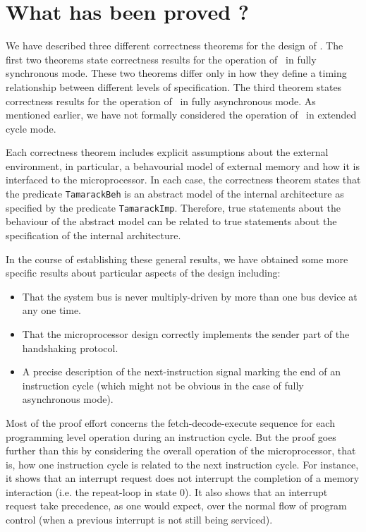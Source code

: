 \section{What has been proved ?}

We have described three different correctness theorems for the
design of \Tamarack.  The first two theorems state correctness
results for the operation of \Tamarack\ in fully synchronous mode.
These two theorems differ only in how they define a timing relationship
between different levels of specification.
The third theorem states correctness results for the operation of
\Tamarack\ in fully asynchronous mode.
As mentioned earlier, we have not formally considered the operation of
\Tamarack\ in extended cycle mode.

Each correctness theorem includes explicit assumptions about
the external environment, in particular,
a behavourial model of external memory and how it is interfaced
to the microprocessor.
In each case, the correctness theorem states that
the predicate \verb"TamarackBeh" is an abstract
model of the internal architecture as specified
by the predicate \verb"TamarackImp".
Therefore, true statements about the behaviour of the abstract model
can be related to
true statements about the specification of the internal architecture.

In the course of establishing these general results,
we have obtained some more specific results about
particular aspects of the design including:

\begin{itemize}
\item
That the system bus is never multiply-driven by more than one bus
device at any one time.

\item
That the microprocessor design correctly implements
the sender part of the handshaking protocol.

\item
A precise description of
the next-instruction signal marking
the end of an instruction cycle (which might not be obvious
in the case of fully asynchronous mode).
\end{itemize}

Most of the proof effort concerns the fetch-decode-execute sequence
for each programming level operation during an instruction cycle.
But the proof goes further than this by considering the
overall operation of the microprocessor,
that is, how one instruction cycle is related to the next instruction
cycle.
For instance, it shows that an interrupt request does not interrupt
the completion of a memory interaction (i.e. the repeat-loop in state 0).
It also shows that an interrupt request take precedence,
as one would expect,
over the normal flow of program control
(when a previous interrupt is not still being serviced).

